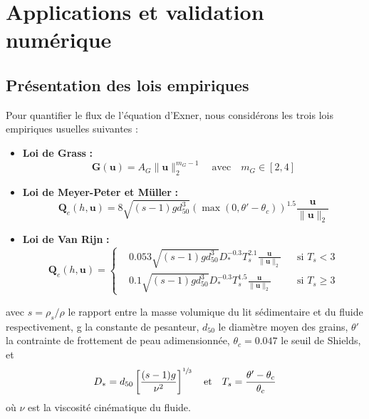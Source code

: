 \documentclass[11pt, a4paper, oneside]{report}
\begin{document}
\newpage

\section{Applications et validation numérique}

\subsection{Présentation des lois empiriques}

Pour quantifier le flux de l'équation d'Exner, nous considérons les trois lois empiriques usuelles suivantes :
\begin{itemize}
    \item \textbf{Loi de Grass} \cite{grass1981sediment} \textbf{:}
    \begin{equation}
        \bm{G} (\bm{u}) = A_G \| \bm{u} \|_2^{m_G - 1} \quad \text{avec} \quad m_G \in [2, 4]
    \end{equation}
    \item \textbf{Loi de Meyer-Peter et Müller} \cite{meyer1948formulas} \textbf{:}
    \begin{equation}
        \bm{Q}_e(h, \bm{u}) = 8 \sqrt{(s - 1) g d_{50}^3} \left( \max \left( 0, \theta' - \theta_c \right) \right)^{1.5} \frac{\bm{u}}{\|\bm{u}\|_2}
    \end{equation}
    \item \textbf{Loi de Van Rijn} \cite{van1984sediment1} \textbf{:}
    \begin{equation}
        \bm{Q}_e(h, \bm{u}) = 
        \left \{
        \begin{aligned}
            & 0.053 \sqrt{(s - 1) g d_{50}^3} D_*^{-0.3} T_s^{2.1} \frac{\bm{u}}{\|\bm{u}\|_2}   && \text{si } T_s < 3 \\
            & 0.1 \sqrt{(s - 1) g d_{50}^3} D_*^{-0.3} T_s^{1.5} \frac{\bm{u}}{\|\bm{u}\|_2}     && \text{si } T_s \geq 3
        \end{aligned}
        \right .
    \end{equation}
\end{itemize}
avec $s = \rho_s / \rho$ le rapport entre la masse volumique du lit sédimentaire et du fluide respectivement, g la constante de pesanteur, $d_{50}$ le diamètre moyen des grains, $\theta'$ la contrainte de frottement de peau adimensionnée, $\theta_c = 0.047$ le seuil de Shields, et
\begin{equation}
        D_* = d_{50} \left[ \frac{(s-1) g}{\nu^2} \right]^{\sfrac{1}{3}} \quad \text{et} \quad T_s = \frac{\theta' - \theta_c}{\theta_c}
\end{equation}
où $\nu$ est la viscosité cinématique du fluide.
\end{document}
